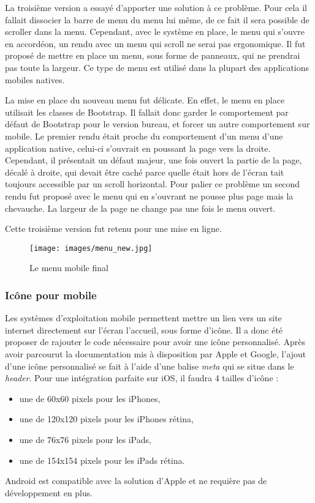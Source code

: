 \documentclass[12pt,a4paper]{article}
\begin{document}
\medskip
La troisième version a essayé d'apporter une solution à ce problème. Pour cela il fallait dissocier la barre de menu du menu lui même, de ce fait il sera possible de scroller dans la menu. Cependant, avec le système en place, le menu qui s'ouvre en accordéon, un rendu avec un menu qui scroll ne serai pas ergonomique. Il fut proposé de mettre en place un menu, sous forme de panneaux, qui ne prendrai pas toute la largeur. Ce type de menu est utilisé dans la plupart des applications mobiles natives.\par
La mise en place du nouveau menu fut délicate. En effet, le menu en place utilisait les classes de Bootstrap. Il fallait donc garder le comportement par défaut de Bootstrap pour le version bureau, et forcer un autre comportement sur mobile. Le premier rendu était proche du comportement d'un menu d'une application native, celui-ci s'ouvrait en poussant la page vers la droite. Cependant, il présentait un défaut majeur, une fois ouvert la partie de la page, décalé à droite, qui devait être caché parce quelle était hors de l'écran tait toujours accessible par un scroll horizontal. Pour palier ce problème un second rendu fut proposé avec le menu qui en s'ouvrant ne pousse plus page mais la chevauche. La largeur de la page ne change pas une fois le menu ouvert.\par 
Cette troisième version fut retenu pour une mise en ligne.

\begin{figure}[h!]
\centering\texttt{[image: images/menu\_new.jpg]} 
\caption{Le menu mobile final}
\end{figure}

\subsubsection{Icône pour mobile}
Les systèmes d'exploitation mobile permettent mettre un lien vers un site internet directement sur l'écran l'accueil, sous forme d'icône. Il a donc été proposer de rajouter le code nécessaire pour avoir une icône personnalisé. Après avoir parcourut la documentation mis à disposition par Apple et Google, l'ajout d'une icône personnalisé se fait à l'aide d'une balise \textit{meta} qui se situe dans le \textit{header}. Pour une intégration parfaite sur iOS, il faudra 4 tailles d'icône :
\begin{itemize}
\item une de 60x60 pixels pour les iPhones,
\item une de 120x120 pixels pour les iPhones rétina,
\item une de 76x76 pixels pour les iPads,
\item une de 154x154 pixels pour les iPads rétina.
\end{itemize}
Android est compatible avec la solution d'Apple et ne requière pas de développement en plus.
\end{document}

